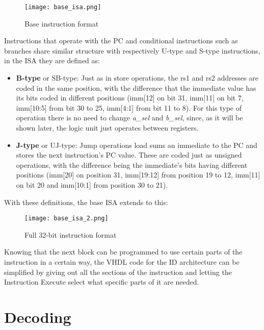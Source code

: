 \begin{figure}[h!]
  \centering
  \texttt{[image: base\_isa.png]}
  \caption{Base instruction format \cite{waterman2016riscv}}
  \label{fig:base_form}
\end{figure}
Instructions that operate with the PC and conditional instructions such as branches share similar structure with respectively U-type and S-type instructions, in the ISA they are defined as:
\begin{itemize}
  \item \textbf{B-type} or SB-type: Just as in store operations, the rs1 and rs2 addresses are coded in the same position, with the difference that the immediate value has its bits coded in different positions (imm[12] on bit 31, imm[11] on bit 7, imm[10:5] from bit 30 to 25, imm[4:1] from bit 11 to 8). For this type of operation there is no need to change \emph{a\_sel} and \emph{b\_sel}, since, as it will be shown later, the logic unit just operates between registers.
  \item \textbf{J-type} or UJ-type: Jump operations load sums an immediate to the PC and stores the next instruction's PC value. These are coded just as unsigned operations, with the difference being the immediate's bits having different positions (imm[20] on position 31, imm[19:12] from position 19 to 12, imm[11] on bit 20 and imm[10:1] from position 30 to 21).
\end{itemize}
With these definitions, the base ISA extends to this:

\begin{figure}[h!]
  \centering
  \texttt{[image: base\_isa\_2.png]}
  \caption{Full 32-bit instruction format \cite{waterman2016riscv}}
  \label{fig:full_form}
\end{figure}
Knowing that the next block can be programmed to use certain parts of the instruction in a certain way, the VHDL code for the ID architecture can be simplified by giving out all the sections of the instruction and letting the Instruction Execute select what specific parts of it are needed.

\section{Decoding}
